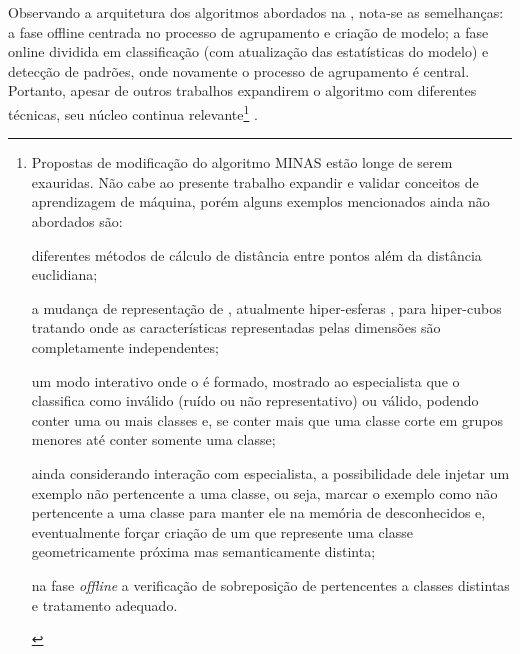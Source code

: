 Observando a arquitetura dos algoritmos abordados na , nota-se as semelhanças:
a fase offline centrada no processo de agrupamento e criação de modelo;
a fase online dividida em classificação (com atualização das estatísticas do modelo)
e detecção de padrões, onde novamente o processo de agrupamento é central.
Portanto, apesar de outros trabalhos expandirem o algoritmo com diferentes técnicas, seu
núcleo continua relevante\footnote{
Propostas de modificação do algoritmo MINAS estão longe de serem exauridas.
Não cabe ao presente trabalho expandir e validar conceitos de aprendizagem de máquina,
porém alguns exemplos mencionados ainda não abordados são:
\begin{enumerate*}[label={\alph*)}]
    
    \item diferentes métodos de cálculo de distância entre pontos além da
    distância euclidiana;
    
    \item a mudança de representação de \clusters, atualmente hiper-esferas
    \cite{Costa2019thesis}, para hiper-cubos tratando \datasets onde as
    características representadas pelas dimensões são completamente
    independentes;
    
    \item um modo interativo onde o \cluster é formado, mostrado ao especialista
    que o classifica como inválido (ruído ou não representativo) ou válido,
    podendo conter uma ou mais classes e, se conter mais que uma classe corte em
    grupos menores até conter somente uma classe;
    
    \item ainda considerando interação com especialista, a possibilidade dele
    injetar um exemplo não pertencente a uma classe, ou seja, marcar o exemplo
    como não pertencente a uma classe para manter ele na memória de
    desconhecidos e, eventualmente forçar criação de um \cluster que represente
    uma classe geometricamente próxima mas semanticamente distinta;
    
    \item na fase \emph{offline} a verificação de sobreposição de \clusters
    pertencentes a classes distintas e tratamento adequado.

\end{enumerate*}
} \cite{DaSilva2018,DaSilva2018thesis,Costa2019}.




